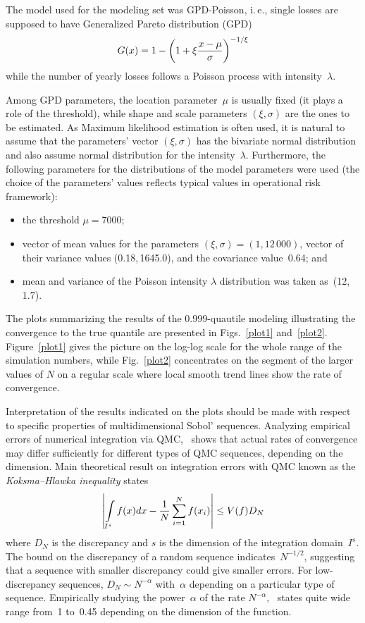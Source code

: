\begin{multicols}{2}
The model used for the modeling set was GPD-Poisson, i.\,e., single
losses are supposed to have Generalized Pareto distribution (GPD)
$$
G(x)= 1-\left(1+\xi\displaystyle\frac{\displaystyle x-\mu\mathstrut}{\displaystyle \sigma\mathstrut}\right)^{-1/\xi}
$$
while the number of yearly losses follows a Poisson process with
intensity~$\lambda$.

Among GPD parameters, the location parameter~$\mu$ is usually fixed
(it plays a role of the threshold), while shape and scale parameters
$(\xi,\sigma)$ are the ones to be estimated. As Maximum likelihood
estimation is often used, it is natural to assume that the
parameters' vector $(\xi,\sigma)$ has the bivariate normal
distribution and also assume normal distribution for the intensity~$\lambda$.
Furthermore, the following parameters for the
distributions of the model parameters were used (the choice of the parameters'
values reflects typical values in operational risk framework):
\begin{itemize}
\item
 the threshold $\mu=7000$;
\item
 vector of mean values for the parameters $(\xi,\sigma)=(1,12\,000)$, vector of
 their variance values (0.18,\,1645.0), and the covariance value~0.64; and
\item
mean and variance of the Poisson intensity $\lambda$ distribution
was taken as~(12,\,1.7).
\end{itemize}

The plots summarizing the results of the 0.999-quautile modeling
illustrating the convergence to the true quantile are presented in
Figs.~\ref{plot1} and~\ref{plot2}. Figure~\ref{plot1} gives
the picture on the log-log scale for the whole range of the
simulation numbers, while Fig.~\ref{plot2} concentrates on the
segment of the larger values of $N$ on a regular scale where local
smooth trend lines show the rate of convergence.




Interpretation of the results indicated on the plots should be made
with respect to specific properties of multidimensional Sobol'
sequences. Analyzing empirical errors of numerical integration via
QMC,~\cite{Morok} shows that actual rates of convergence may differ
sufficiently for different types of QMC sequences, depending on the
dimension. Main theoretical result on integration errors with QMC
known as the {\it Koksma--Hlawka inequality} states
$$
\left|\int\limits_{I^s}f(x)dx - \displaystyle\frac{\displaystyle 1\mathstrut}{\displaystyle N\mathstrut}\sum_{i=1}^N f(x_i)
\right|\leq V(f)D_N
$$
where $D_N$ is the discrepancy and $s$ is the dimension of the
integration domain~$I^s$. The bound on the discrepancy of a random
sequence indicates~$N^{-1/2}$, suggesting that a sequence with
smaller discrepancy could give smaller errors. For low-discrepancy
sequences, $D_N\sim N^{-\alpha}$ with~$\alpha$ depending on a
particular type of sequence. Empirically studying the power~$\alpha$
of the rate $N^{-\alpha}$,~\cite{Morok} states quite wide range from~1 to~0.45
depending on the dimension of the function.


\end{multicols}
